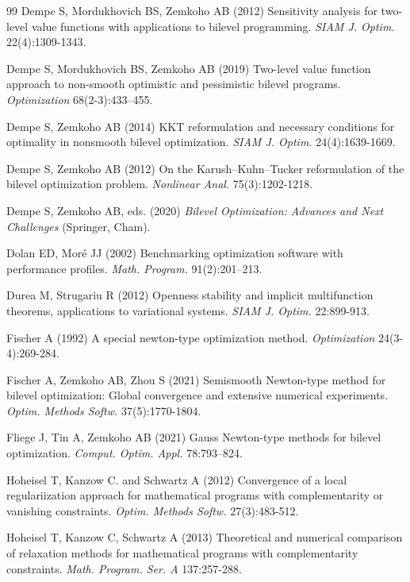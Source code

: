 \begin{thebibliography}{99}
 Dempe S, Mordukhovich BS, Zemkoho AB (2012) Sensitivity
	analysis for two-level value functions with applications to bilevel
	programming. \emph{SIAM J. Optim.} 22(4):1309-1343.
	
 Dempe S, Mordukhovich BS, Zemkoho AB (2019) Two-level
	value function approach to non-smooth optimistic and pessimistic bilevel programs. \emph{Optimization} 68(2-3):433--455.
	
  Dempe S, Zemkoho AB (2014) KKT reformulation and necessary conditions for optimality in nonsmooth bilevel optimization. \emph{SIAM J. Optim.} 24(4):1639-1669.

  Dempe S, Zemkoho AB (2012) On the Karush–Kuhn–Tucker reformulation of the bilevel optimization problem. \emph{Nonlinear Anal.} 75(3):1202-1218.
	
Dempe S, Zemkoho AB,  eds. (2020)  \emph{Bilevel Optimization: Advances and Next Challenges} (Springer, Cham).

 Dolan ED, Mor\'{e} JJ (2002) Benchmarking optimization software with performance profiles. \emph{Math. Program.} 91(2):201–213.
    
 Durea M, Strugariu R  (2012) Openness stability and implicit
	multifunction theorems, applications to variational systems. \emph{SIAM J. Optim.}
	22:899-913.
	
 Fischer A (1992) A special newton-type optimization
	method. \emph{Optimization} 24(3-4):269-284.
	
	  Fischer A, Zemkoho AB, Zhou S (2021)
	Semismooth Newton-type method for bilevel optimization: Global convergence and
	extensive numerical experiments.  \emph{Optim. Methods Softw.} 37(5):1770-1804.
	
	  Fliege J, Tin  A, Zemkoho AB (2021)
	Gauss Newton-type methods for bilevel optimization. \emph{Comput. Optim. Appl.}  78:793–824.
	
	Hoheisel T, Kanzow C. and Schwartz A (2012) Convergence of a local regulariization approach for mathematical programs with complementarity or vanishing constraints. \textit{Optim. Methods
Softw.}  27(3):483-512.
	

 Hoheisel T, Kanzow C, Schwartz A (2013)
	Theoretical and numerical comparison of relaxation methods for mathematical
	programs with complementarity constraints. \emph{Math. Program. Ser. A} 137:257-288.
 

\end{thebibliography}
